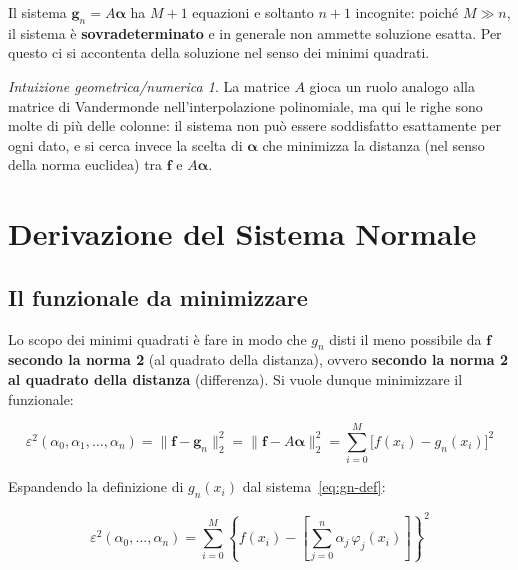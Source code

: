 \documentclass[a4paper,12pt]{article}
\theoremstyle{definition}
\theoremstyle{remark}
\newtheorem*{intuizione}{Intuizione geometrica/numerica}
\begin{document}
\noindent Il sistema $\mathbf{g}_n = A\boldsymbol{\alpha}$ ha $M+1$ equazioni
e soltanto $n+1$ incognite: poiché $M \gg n$, il sistema è
\textbf{sovradeterminato} e in generale non ammette soluzione esatta.
Per questo ci si accontenta della soluzione nel senso dei minimi quadrati.

\begin{intuizione}
La matrice $A$ gioca un ruolo analogo alla matrice di Vandermonde
nell'interpolazione polinomiale, ma qui le righe sono molte di più
delle colonne: il sistema non può essere soddisfatto esattamente per ogni
dato, e si cerca invece la scelta di $\boldsymbol{\alpha}$ che minimizza
la distanza (nel senso della norma euclidea) tra $\mathbf{f}$ e
$A\boldsymbol{\alpha}$.
\end{intuizione}

\section{Derivazione del Sistema Normale}

\subsection{Il funzionale da minimizzare}

Lo scopo dei minimi quadrati è fare in modo che $g_n$ disti il meno
possibile da $\mathbf{f}$ \textbf{secondo la norma 2} (al quadrato della
distanza), ovvero \textbf{secondo la norma 2 al quadrato della distanza}
(differenza). Si vuole dunque minimizzare il funzionale:

\begin{equation}
  \varepsilon^2(\alpha_0, \alpha_1, \ldots, \alpha_n)
  = \|\mathbf{f} - \mathbf{g}_n\|_2^2
  = \|\mathbf{f} - A\boldsymbol{\alpha}\|_2^2
  = \sum_{i=0}^{M} \bigl[f(x_i) - g_n(x_i)\bigr]^2
  \label{eq:funzionale}
\end{equation}

\noindent Espandendo la definizione di $g_n(x_i)$ dal
sistema~\eqref{eq:gn-def}:

\begin{equation}
  \varepsilon^2(\alpha_0, \ldots, \alpha_n)
  = \sum_{i=0}^{M}
    \left\{f(x_i) - \left[\sum_{j=0}^{n} \alpha_j\,\varphi_j(x_i)\right]
    \right\}^2
  \label{eq:funzionale-espanso}
\end{equation}
\end{document}
